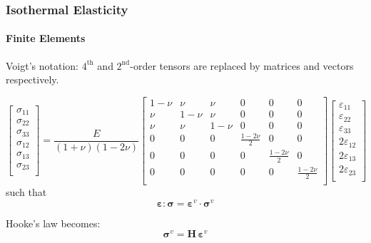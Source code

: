 \documentclass[10pt,xcolor=pdftex,dvipsnames,table]{beamer}
\begin{document}
\begin{frame}
	\frametitle{ Isothermal Elasticity }
	\framesubtitle{ Finite Elements }
	
	Voigt's notation: $4^{\text{th}}$ and $2^{\text{nd}}$-order tensors are replaced by matrices and vectors respectively.
	
	\begin{equation*}
		\begin{bmatrix}
			\sigma_{11} \\
			\sigma_{22} \\
			\sigma_{33} \\
			\sigma_{12} \\
			\sigma_{13} \\
			\sigma_{23} \\	
		\end{bmatrix}
		= \frac{E}{(1+\nu)(1-2\nu)}
		\begin{bmatrix}
			1-\nu & \nu & \nu & 0 & 0 & 0 \\
			\nu & 1-\nu &  \nu & 0 & 0 & 0 \\
			\nu & \nu & 1-\nu &  0 & 0 & 0 \\
			0 &0 & 0 & \frac{1-2\nu}{2} & 0 & 0 \\
			0 &0 & 0 & 0 &\frac{1-2\nu}{2}  & 0 \\
			0 &0 & 0  & 0 & 0 & \frac{1-2\nu}{2} \\
		\end{bmatrix}
		\begin{bmatrix}
			\varepsilon_{11} \\
			\varepsilon_{22} \\
			\varepsilon_{33} \\
			2\varepsilon_{12} \\
			2\varepsilon_{13} \\
			2\varepsilon_{23} \\	
		\end{bmatrix}			
	\end{equation*}	
	such that
	\begin{equation*}
		\boldsymbol{\varepsilon}:\boldsymbol{\sigma} = \boldsymbol{\varepsilon}^v\cdot \boldsymbol{\sigma}^v
	\end{equation*}	
	
	
	Hooke's law becomes:
	\begin{equation*}
		\boldsymbol{\sigma}^v = \mathbf{H}\,\boldsymbol{\varepsilon}^v
	\end{equation*}		
	
\end{frame}
\end{document}
